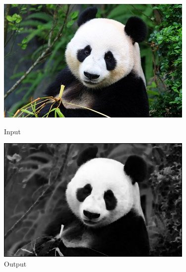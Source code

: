 \documentclass[a4paper,8pt]{article}
\begin{document}
        \begin{figure}[H]
        \centering
        \begin{minipage}{0.4\linewidth}
        \centering
        \includegraphics[width=\linewidth]{output/input1.jpg}
        \caption{Input}
        \end{minipage}
        \hfill
        \begin{minipage}{0.4\linewidth}
        \centering
        \includegraphics[width=\linewidth]{output/Average Filter_output.png}
        \caption{Output}
        \end{minipage}
        \end{figure}
        \clearpage
        
\end{document}
